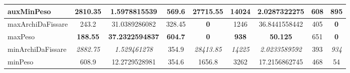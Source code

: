 \begin{table}
\begin{tabular}{l|c|c|c|c|c|c|c|c}
auxMinPeso          & 2810.35              & 1.5978815539                                                     & 569.6                                                                       & 27715.55                                                                   & 14024              & 2.0287322275                                                   & 608                                                                     & 895                                                                    \\ \hline
\rowcolor[HTML]{EFEFEF} 
maxArchiDaFissare   & 243.2                & 31.0389286082                                                    & 328.45                                                                      & \textbf{0}                                                                 & 1246               & 36.8441558442                                                  & 405                                                                     & \textbf{0}                                                             \\ \hline
maxPeso             & \textbf{188.55}      & \textbf{37.2322594837}                                           & \textbf{604.7}                                                              & \textbf{0}                                                                 & \textbf{938}       & \textbf{50.125}                                                & 651                                                                     & \textbf{0}                                                             \\ \hline
\rowcolor[HTML]{EFEFEF} 
minArchiDaFissare   & \textit{2882.75}     & \textit{1.529461278}                                             & 354.9                                                                       & \textit{28413.85}                                                          & \textit{14225}     & \textit{2.0233589592}                                          & 393                                                                     & \textit{934}                                                           \\ \hline
minPeso             & 608.9                & 12.2729528981                                                    & 354.6                                                                       & 1656.8                                                                     & 3262               & 17.2156862745                                                  & 468                                                                     & 54                                                                     \\ \hline

\end{tabular}
\end{table}
